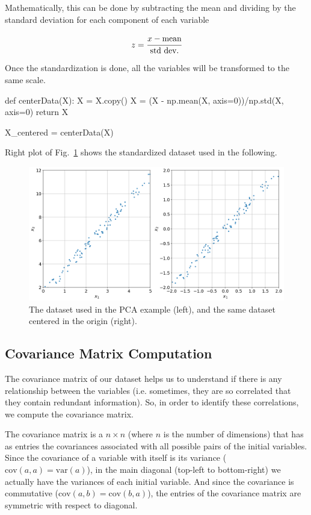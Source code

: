 Mathematically, this can be done by subtracting the mean and dividing by the standard deviation for each component of each variable

\begin{equation}
z = \cfrac{x - \textrm{mean}}{\textrm{std dev.}}
\end{equation}

Once the standardization is done, all the variables will be transformed to the same scale.

\begin{ipython}
def centerData(X):
    X = X.copy()
    X = (X - np.mean(X, axis=0))/np.std(X, axis=0)
    return X
    
X_centered = centerData(X)
\end{ipython}

Right plot of Fig.~\ref{fig:pca_dataset} shows the standardized dataset used in the following.

\begin{figure}[htb]
	\centering
	\includegraphics[width=0.9\linewidth]{figures/pca_dataset_both}
	\caption{The dataset used in the PCA example (left), and the same dataset centered in the origin (right).}
	\label{fig:pca_dataset}
\end{figure}

\subsection{Covariance Matrix Computation}
The covariance matrix of our dataset helps us to understand if there is any relationship between the variables (i.e. sometimes, they are so correlated that they contain redundant information). So, in order to identify these correlations, we compute the covariance matrix.

The covariance matrix is a $n\times n$ (where $n$ is the number of dimensions) that has as entries the covariances associated with all possible pairs of the initial variables. Since the covariance of a variable with itself is its variance ($\textrm{cov}(a, a)= \textrm{var}(a)$), in the main diagonal (top-left to bottom-right) we actually have the variances of each initial variable. And since the covariance is commutative ($\textrm{cov}(a, b) = \textrm{cov}(b, a)$), the entries of the covariance matrix are symmetric with respect to diagonal.

